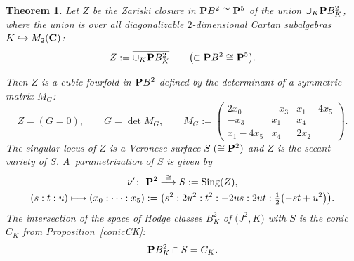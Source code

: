 \documentclass[10pt,a4paper]{amsart}
\numberwithin{equation}{section}
\newtheorem{Theorem}{Theorem}[section]
\begin{document}
\begin{Theorem} \label{thmz}
Let $Z$ be the Zariski closure in ${\bf P} B^2\cong{\bf P}^5$ of the union
$\cup_K {\bf P} B^2_K$, where the union is over all
diagonalizable $2$-dimensional Cartan subalgebras $K\hookrightarrow M_2({\bf C})$:
\[
Z := \overline{\cup_K {\bf P} B^2_K}\qquad\big(\!\!\subset {\bf P} B^2 \cong {\bf P}^5\big).
\]

Then $Z$ is a cubic fourfold in ${\bf P} B^2$ defined by
the determinant of a symmetric matrix $M_G$:
\[
Z = (G=0),\qquad
G = \det M_G,\qquad
M_G := \left(\begin{matrix}
2x_0&-x_3&x_1-4x_5\\
-x_3&x_1&x_4\\
x_1-4x_5&x_4&2x_2
\end{matrix}\right).
\]
The singular locus of $Z$ is a Veronese surface $S\;(\cong{\bf P}^2)$ and $Z$ is the secant variety of $S$.
A~parametrization of $S$ is given by
\begin{gather*}
\nu' \colon \ {\bf P}^2 \stackrel{\cong}{\longrightarrow} S := \operatorname{Sing}(Z),\\
(s:t:u)\longmapsto (x_0:\dots:x_5):=
\big(s^2: 2u^2:t^2: -2us: 2ut: \tfrac{1}{2}\big({-}st + u^2\big)\big).
\end{gather*}
The intersection of the space of Hodge classes $B^2_K$ of $\big(J^2,K\big)$ with $S$ is the conic
$C_K$ from Proposition~{\rm \ref{conicCK}}:
\[
{\bf P} B^2_K \cap S = C_K.
\]
\end{Theorem}
\end{document}
